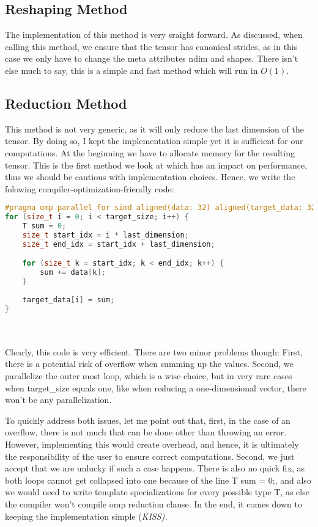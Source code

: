 \documentclass[sigconf]{acmart}
\renewcommand{\texttt}[1]{\begingroup\ttfamily\sloppy\hbadness=10000 #1\endgroup}
\begin{document}
\subsection{Reshaping Method}
The implementation of this method is very sraight forward. As discussed, when calling this method, we ensure that the tensor has canonical strides, as in this case we only have to change the meta attributes \texttt{ndim} and \texttt{shapes}. There isn't else much to say, this is a simple and fast method which will run in $O(1)$.

\subsection{Reduction Method}
This method is not very generic, as it will only reduce the last dimension of the tensor. By doing so, I kept the implementation simple yet it is sufficient for our computations. At the beginning we have to allocate memory for the resulting tensor. This is the first method we look at which has an impact on performance, thus we should be cautious with implementation choices. Hence, we write the folowing compiler-optimization-friendly code:

\begin{lstlisting}[language=C++]
#pragma omp parallel for simd aligned(data: 32) aligned(target_data: 32)
for (size_t i = 0; i < target_size; i++) {
    T sum = 0;
    size_t start_idx = i * last_dimension;
    size_t end_idx = start_idx + last_dimension;

    for (size_t k = start_idx; k < end_idx; k++) {
        sum += data[k];
    }
    
    target_data[i] = sum;
}
\end{lstlisting}
\\\\
Clearly, this code is very efficient. There are two minor problems though: First, there is a potential risk of overflow when summing up the values. Second, we parallelize the outer most loop, which is a wise choice, but in very rare cases when \texttt{target\_size} equals one, like when reducing a one-dimensional vector, there won't be any parallelization.

To quickly address both issues, let me point out that, first, in the case of an overflow, there is not much that can be done other than throwing an error. However, implementing this would create overhead, and hence, it is ultimately the responsibility of the user to ensure correct computations. Second, we just accept that we are unlucky if such a case happens. There is also no quick fix, as both loops cannot get collapsed into one because of the line \texttt{T sum = 0;}, and also we would need to write template specializations for every possible type \texttt{T}, as else the compiler won't compile omp reduction clause. In the end, it comes down to keeping the implementation simple (\em KISS\em ).
\end{document}
